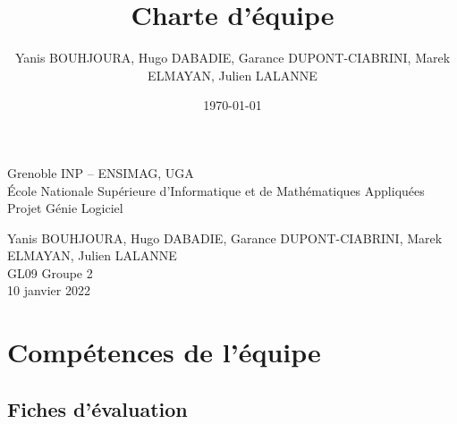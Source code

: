 \documentclass[12pt,a4paper,twoside]{article}
\title{Charte d'équipe}
\author{Yanis BOUHJOURA, Hugo DABADIE, Garance DUPONT-CIABRINI, Marek ELMAYAN, Julien LALANNE}
\date{\today}
\begin{document}
	\lstset{ numbers=left, tabsize=3, frame=single, numberstyle=\ttfamily, basicstyle=\footnotesize} 
	\thispagestyle{empty}
	
	\begin{center}
		\vspace{1cm}
		
		Grenoble INP  -- ENSIMAG, UGA\\
		École Nationale Supérieure d'Informatique et de Mathématiques Appliquées\\
		\vspace{5cm}
		{\LARGE Projet Génie Logiciel}\\
		\vspace{3cm}
	
		\vspace{3cm}
		Yanis BOUHJOURA, Hugo DABADIE, Garance DUPONT-CIABRINI, Marek ELMAYAN, Julien LALANNE \\
		\vspace{3mm}
		GL09 Groupe 2\\
		\vspace{3mm}
		10 janvier 2022\\
		
		
	\end{center}
	

	\newpage
	
	\tableofcontents
	
	\newpage

	\section{Compétences de l'équipe}
		
		\subsection{Fiches d'évaluation}
		
		\vspace{3mm}
		
\end{document}
